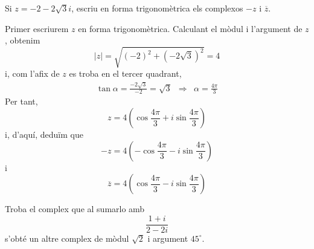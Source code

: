 \begin{exemple}
Si $z=-2-2\sqrt{3}i$, escriu en forma trigonomètrica els complexos $-z$
i $\overline{z}$.
\end{exemple}

\begin{solucio}
Primer escriurem $z$ en forma trigonomètrica. Calculant el mòdul i l’argument de $z$, obtenim
\begin{equation*}
\left\vert z\right\vert =\sqrt{(-2)^{2}+\left( -2\sqrt{3}\right) ^{2}}=4
\end{equation*}
i, com l’afix de $z$ es troba en el tercer quadrant,
\begin{equation*}
\begin{array}{lll}
\tan \alpha =\frac{-2\sqrt{3}}{-2}=\sqrt{3} & \Longrightarrow & \alpha =
\frac{4\pi }{3}
\end{array}
\end{equation*}
Per tant,
\begin{equation*}
z=4\left( \cos \frac{4\pi }{3}+i\sin \frac{4\pi }{3}\right)
\end{equation*}
i, d’aquí, deduïm que
\begin{equation*}
-z=4\left( -\cos \frac{4\pi }{3}-i\sin \frac{4\pi }{3}\right)
\end{equation*}
i
\begin{equation*}
\overline{z}=4\left( \cos \frac{4\pi }{3}-i\sin \frac{4\pi }{3}\right)
\end{equation*}
\end{solucio}

\begin{exemple}
Troba el complex que al sumarlo amb
\begin{equation*}
\frac{1+i}{2-2i}
\end{equation*}
s’obté un altre complex de mòdul $\sqrt{2}$ i argument $45
^{\circ}
$.
\end{exemple}

